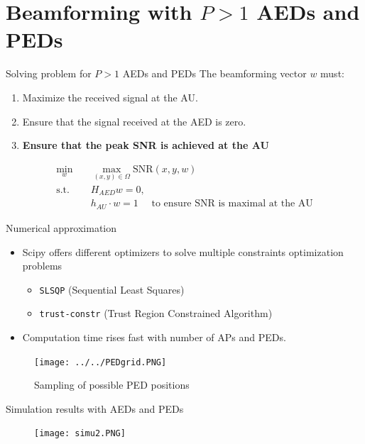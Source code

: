 \documentclass[aspectratio=169,xcolor=dvipsnames]{beamer}
\begin{document}
	\section{Beamforming with $P>1$ AEDs and PEDs}
	
	\begin{frame}{Solving problem for $P > 1$ AEDs and PEDs}
		The beamforming vector \( w \) must:
		\begin{enumerate}
			\item Maximize the received signal at the AU.
			\item Ensure that the signal received at the AED is zero.
			\item \textbf{Ensure that the peak SNR is achieved at the AU}
		\end{enumerate}
		\begin{align}
			\min_w \quad & \max_{(x,y) \in \Omega} \text{SNR}(x, y, w)  \\
			\text{s.t.} \quad & H_{AED} w = 0, \\
			& h_{AU} \cdot w = 1 \quad \text{ to ensure SNR is maximal at the AU}
		\end{align}
	\end{frame}
	
	\begin{frame}{Numerical approximation}
		\begin{itemize}
			\item Scipy offers different optimizers to solve multiple constraints optimization problems
				\begin{itemize}
					\item \texttt{SLSQP} (Sequential Least Squares)
					\item \texttt{trust-constr} (Trust Region Constrained Algorithm)
				\end{itemize}
			\item Computation time rises fast with number of APs and PEDs.
		\end{itemize}
		
		\begin{figure}[h!]
			\centering
			\texttt{[image: ../../PEDgrid.PNG]}
			\caption{Sampling of possible PED positions}
		\end{figure}
	\end{frame}
	
	\begin{frame}{Simulation results with AEDs and PEDs}
		\begin{figure}[h!]
			\centering
			\texttt{[image: simu2.PNG]}
		\end{figure}
	\end{frame}
	
\end{document}

